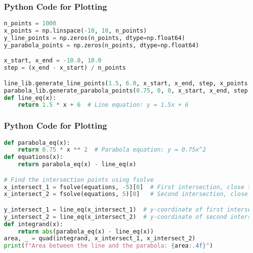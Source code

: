 \documentclass{beamer}
\theoremstyle{remark}
\numberwithin{equation}{section}
\begin{document}
\begin{frame}[fragile]
\frametitle{Python Code for Plotting}
\begin{lstlisting}[language=Python]
n_points = 1000
x_points = np.linspace(-10, 10, n_points)
y_line_points = np.zeros(n_points, dtype=np.float64)
y_parabola_points = np.zeros(n_points, dtype=np.float64)

x_start, x_end = -10.0, 10.0
step = (x_end - x_start) / n_points

line_lib.generate_line_points(1.5, 6.0, x_start, x_end, step, x_points.ctypes.data_as(ctypes.POINTER(ctypes.c_double)), y_line_points.ctypes.data_as(ctypes.POINTER(ctypes.c_double)))
parabola_lib.generate_parabola_points(0.75, 0, 0, x_start, x_end, step, x_points.ctypes.data_as(ctypes.POINTER(ctypes.c_double)), y_parabola_points.ctypes.data_as(ctypes.POINTER(ctypes.c_double)))
def line_eq(x):
    return 1.5 * x + 6  # Line equation: y = 1.5x + 6

\end{lstlisting}
\end{frame}

\begin{frame}[fragile]
\frametitle{Python Code for Plotting}
\begin{lstlisting}[language=Python]
def parabola_eq(x):
    return 0.75 * x ** 2  # Parabola equation: y = 0.75x^2
def equations(x):
    return parabola_eq(x) - line_eq(x)

# Find the intersection points using fsolve
x_intersect_1 = fsolve(equations, -5)[0]  # First intersection, close to -5
x_intersect_2 = fsolve(equations, 5)[0]   # Second intersection, close to 5

y_intersect_1 = line_eq(x_intersect_1)  # y-coordinate of first intersection
y_intersect_2 = line_eq(x_intersect_2)  # y-coordinate of second intersection
def integrand(x):
    return abs(parabola_eq(x) - line_eq(x))
area, _ = quad(integrand, x_intersect_1, x_intersect_2)
print(f"Area between the line and the parabola: {area:.4f}")



\end{lstlisting}
\end{frame}
\end{document}
